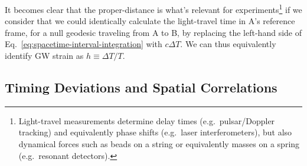 \documentclass[onecolumn,authoryear]{els-mrw}
\begin{document}
It becomes clear that the proper-distance is what's relevant for experiments\footnote{Light-travel measurements determine delay times (e.g.~pulsar/Doppler tracking) and equivalently phase shifts (e.g.~laser interferometers), but also dynamical forces such as beads on a string or equivalently masses on a spring (e.g.~resonant detectors).} if we consider that we could identically calculate the light-travel time in A's reference frame, for a null geodesic traveling from A to B, by replacing the left-hand side of Eq.~\ref{eq:spacetime-interval-integration} with $c \Delta T$.  We can thus equivalently identify GW strain as \mbox{$h \equiv \Delta T / T$}.

\subsection{Timing Deviations and Spatial Correlations}\label{sec:timing-deviations-spatial-correlations}

\end{document}
